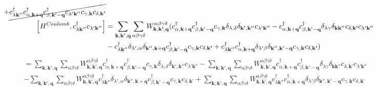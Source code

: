 \documentclass[12pt,english,a4paper]{article}
\newcommand{\dg}{\dagger}
\begin{document}
\begin{appendices}
\begin{align}
+ \cancel{c^\dg_{\lambda \textbf{k}''}  c_{\alpha, \textbf{k}+\textbf{q}}^\dg c_{\beta, \textbf{k}' - \textbf{q}}^\dg c_{\lambda' \textbf{k}''}  c_{\gamma, \textbf{k}}c_{\delta, \textbf{k'}}} \nonumber\\
%
%
\comm{H^{Coulomb}}{c^\dg_{\lambda \textbf{k}''} c_{\lambda' \textbf{k}''}} &= \sum_{\textbf{k}, \textbf{k}', \textbf{q}} \sum_{\alpha \beta \gamma \delta} W^{\alpha \beta \gamma \delta}_{\textbf{k},\textbf{k'},\textbf{q}}(c_{\alpha, \textbf{k}+\textbf{q}}^\dg c_{\beta, \textbf{k}' - \textbf{q}}^\dg c_{\gamma, \textbf{k}}\delta_{\lambda,\delta} \delta_{\textbf{k}',\textbf{k}''} c_{\lambda' \textbf{k}''} - c_{\alpha, \textbf{k}+\textbf{q}}^\dg c_{\beta, \textbf{k}' - \textbf{q}}^\dg \delta_{\lambda \gamma} \delta_{\textbf{k}\textbf{k}''}c_{\delta, \textbf{k'}} c_{\lambda' \textbf{k}''}\nonumber \\
&- c^\dg_{\lambda \textbf{k}''} \delta_{\lambda',\alpha} \delta_{\textbf{k}'',\textbf{k}+\textbf{q}} c_{\beta, \textbf{k}' - \textbf{q}}^\dg c_{\gamma, \textbf{k}}c_{\delta, \textbf{k'}} + c^\dg_{\lambda \textbf{k}''}  c_{\alpha, \textbf{k}+\textbf{q}}^\dg \delta_{\lambda'\beta} \delta_{\textbf{k}'',\textbf{k}'-\textbf{q}} c_{\gamma, \textbf{k}}c_{\delta, \textbf{k'}})\nonumber
\end{align}
\begin{align}
	&= \sum_{\textbf{k}, \textbf{k}', \textbf{q}} \sum_{\alpha \beta \gamma \delta} W^{\alpha \beta \gamma \delta}_{\textbf{k},\textbf{k'},\textbf{q}}c_{\alpha, \textbf{k}+\textbf{q}}^\dg c_{\beta, \textbf{k}' - \textbf{q}}^\dg c_{\gamma, \textbf{k}}\delta_{\lambda,\delta} \delta_{\textbf{k}',\textbf{k}''} c_{\lambda' \textbf{k}''}- \sum_{\textbf{k}, \textbf{k}', \textbf{q}} \sum_{\alpha \beta \gamma \delta} W^{\alpha \beta \gamma \delta}_{\textbf{k},\textbf{k'},\textbf{q}}c_{\alpha, \textbf{k}+\textbf{q}}^\dg c_{\beta, \textbf{k}' - \textbf{q}}^\dg \delta_{\lambda \gamma} \delta_{\textbf{k}\textbf{k}''}c_{\delta, \textbf{k'}} c_{\lambda' \textbf{k}''}\nonumber \\
	&- \sum_{\textbf{k}, \textbf{k}', \textbf{q}} \sum_{\alpha \beta \gamma \delta} W^{\alpha \beta \gamma \delta}_{\textbf{k},\textbf{k'},\textbf{q}}c^\dg_{\lambda \textbf{k}''} \delta_{\lambda',\alpha} \delta_{\textbf{k}'',\textbf{k}+\textbf{q}} c_{\beta, \textbf{k}' - \textbf{q}}^\dg c_{\gamma, \textbf{k}}c_{\delta, \textbf{k'}} + \sum_{\textbf{k}, \textbf{k}', \textbf{q}} \sum_{\alpha \beta \gamma \delta} W^{\alpha \beta \gamma \delta}_{\textbf{k},\textbf{k'},\textbf{q}}c^\dg_{\lambda \textbf{k}''}  c_{\alpha, \textbf{k}+\textbf{q}}^\dg \delta_{\lambda'\beta} \delta_{\textbf{k}'',\textbf{k}'-\textbf{q}} c_{\gamma, \textbf{k}}c_{\delta, \textbf{k'}}\nonumber \\

\end{align}
\end{appendices}
\end{document}
